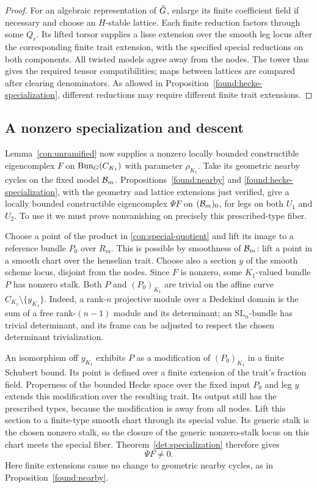 \begin{proof}
For an algebraic representation of $\check G$, enlarge its finite
coefficient field if necessary and choose an $H$-stable lattice.
Each finite reduction factors through some $Q_r$.  Its lifted
torsor supplies a lisse extension over the smooth leg locus after
the corresponding finite trait extension, with the specified
special reductions on both components.  All twisted models agree
away from the nodes.  The tower thus gives the required tensor
compatibilities; maps between lattices are compared after clearing
denominators.  As allowed in
Proposition~\ref{found:hecke-specialization}, different reductions
may require different finite trait extensions.
\end{proof}

\subsection{A nonzero specialization and descent}

Lemma~\ref{con:unramified} now supplies a nonzero locally bounded
constructible eigencomplex $F$ on $\operatorname{Bun}_G(C_{K_1})$ with parameter
$\rho_{K_1}$.  Take its geometric nearby cycles on the fixed model
$\mathcal B_m$.  Propositions~\ref{found:nearby} and
\ref{found:hecke-specialization}, with the geometry and lattice
extensions just verified, give a locally bounded constructible
eigencomplex $\Psi F$ on $(\mathcal B_m)_0$, for legs on both $U_1$ and
$U_2$.  To use it we must prove nonvanishing on precisely this
prescribed-type fiber.

Choose a point of the product in \eqref{con:special-quotient} and
lift its image to a reference bundle $P_0$ over $R_m$.  This is
possible by smoothness of $\mathcal B_m$: lift a point in a smooth chart
over the henselian trait.  Choose also a section $y$ of the smooth
scheme locus, disjoint from the nodes.  Since $F$ is nonzero, some
$K_1$-valued bundle $P$ has nonzero stalk.  Both $P$ and $(P_0)_{K_1}$
are trivial on the affine curve $C_{K_1}\setminus\{y_{K_1}\}$.
Indeed, a rank-$n$ projective module over a Dedekind domain is the
sum of a free rank-$(n-1)$ module and its determinant; an
$\mathrm{SL}_n$-bundle has trivial determinant, and its frame can be
adjusted to respect the chosen determinant trivialization.

An isomorphism off $y_{K_1}$ exhibits $P$ as a modification of
$(P_0)_{K_1}$ in a finite Schubert bound.  Its point is defined over
a finite extension of the trait's fraction field.  Properness of
the bounded Hecke space over the fixed input $P_0$ and leg $y$
extends this modification over the resulting trait.  Its output
still has the prescribed types, because the modification is away
from all nodes.  Lift this section to a finite-type smooth chart
through its special value.  Its generic stalk is the chosen nonzero
stalk, so the closure of the generic nonzero-stalk locus on this
chart meets the special fiber.  Theorem~\ref{det:specialization}
therefore gives
\begin{equation}\label{con:nonzero-nearby}
                         \Psi F\ne0.
\end{equation}
Here finite extensions cause no change to geometric nearby cycles,
as in Proposition~\ref{found:nearby}.

